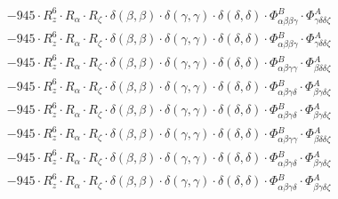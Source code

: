 \documentclass{article}
\begin{document}
\begin{subequations}
\begin{gather}
\begin{array}{c}
 \\[0.2em] 		 - 945 \cdot R_{z}^{6} \cdot R_{\alpha{}} \cdot R_{\zeta{}} \cdot \delta{}\left(\beta{}, \beta{}\right) \cdot \delta{}\left(\gamma{}, \gamma{}\right) \cdot \delta{}\left(\delta{}, \delta{}\right) \cdot \Phi{}^{B}_{\alpha{}\beta{}\beta{}\gamma{}} \cdot \Phi{}^{A}_{\gamma{}\delta{}\delta{}\zeta{}} 
 \\[0.2em] 		 - 945 \cdot R_{z}^{6} \cdot R_{\alpha{}} \cdot R_{\zeta{}} \cdot \delta{}\left(\beta{}, \beta{}\right) \cdot \delta{}\left(\gamma{}, \gamma{}\right) \cdot \delta{}\left(\delta{}, \delta{}\right) \cdot \Phi{}^{B}_{\alpha{}\beta{}\beta{}\gamma{}} \cdot \Phi{}^{A}_{\gamma{}\delta{}\delta{}\zeta{}} 
 \\[0.2em] 		 - 945 \cdot R_{z}^{6} \cdot R_{\alpha{}} \cdot R_{\zeta{}} \cdot \delta{}\left(\beta{}, \beta{}\right) \cdot \delta{}\left(\gamma{}, \gamma{}\right) \cdot \delta{}\left(\delta{}, \delta{}\right) \cdot \Phi{}^{B}_{\alpha{}\beta{}\gamma{}\gamma{}} \cdot \Phi{}^{A}_{\beta{}\delta{}\delta{}\zeta{}} 
 \\[0.2em] 		 - 945 \cdot R_{z}^{6} \cdot R_{\alpha{}} \cdot R_{\zeta{}} \cdot \delta{}\left(\beta{}, \beta{}\right) \cdot \delta{}\left(\gamma{}, \gamma{}\right) \cdot \delta{}\left(\delta{}, \delta{}\right) \cdot \Phi{}^{B}_{\alpha{}\beta{}\gamma{}\delta{}} \cdot \Phi{}^{A}_{\beta{}\gamma{}\delta{}\zeta{}} 
 \\[0.2em] 		 - 945 \cdot R_{z}^{6} \cdot R_{\alpha{}} \cdot R_{\zeta{}} \cdot \delta{}\left(\beta{}, \beta{}\right) \cdot \delta{}\left(\gamma{}, \gamma{}\right) \cdot \delta{}\left(\delta{}, \delta{}\right) \cdot \Phi{}^{B}_{\alpha{}\beta{}\gamma{}\delta{}} \cdot \Phi{}^{A}_{\beta{}\gamma{}\delta{}\zeta{}} 
 \\[0.2em] 		 - 945 \cdot R_{z}^{6} \cdot R_{\alpha{}} \cdot R_{\zeta{}} \cdot \delta{}\left(\beta{}, \beta{}\right) \cdot \delta{}\left(\gamma{}, \gamma{}\right) \cdot \delta{}\left(\delta{}, \delta{}\right) \cdot \Phi{}^{B}_{\alpha{}\beta{}\gamma{}\gamma{}} \cdot \Phi{}^{A}_{\beta{}\delta{}\delta{}\zeta{}} 
 \\[0.2em] 		 - 945 \cdot R_{z}^{6} \cdot R_{\alpha{}} \cdot R_{\zeta{}} \cdot \delta{}\left(\beta{}, \beta{}\right) \cdot \delta{}\left(\gamma{}, \gamma{}\right) \cdot \delta{}\left(\delta{}, \delta{}\right) \cdot \Phi{}^{B}_{\alpha{}\beta{}\gamma{}\delta{}} \cdot \Phi{}^{A}_{\beta{}\gamma{}\delta{}\zeta{}} 
 \\[0.2em] 		 - 945 \cdot R_{z}^{6} \cdot R_{\alpha{}} \cdot R_{\zeta{}} \cdot \delta{}\left(\beta{}, \beta{}\right) \cdot \delta{}\left(\gamma{}, \gamma{}\right) \cdot \delta{}\left(\delta{}, \delta{}\right) \cdot \Phi{}^{B}_{\alpha{}\beta{}\gamma{}\delta{}} \cdot \Phi{}^{A}_{\beta{}\gamma{}\delta{}\zeta{}} 

\end{array}
\end{gather}
\end{subequations}
\end{document}
